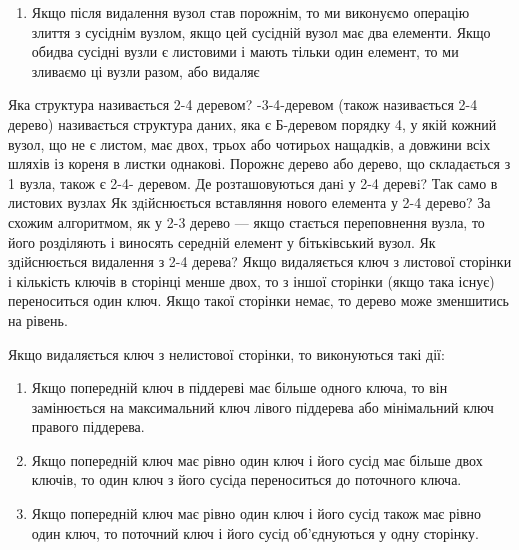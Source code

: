 \documentclass[a4paper, 12pt, oneside]{extarticle}
\begin{document}
\begin{itemize}
\begin{enumerate}
			\item Якщо після видалення вузол став порожнім, то ми виконуємо операцію злиття з сусіднім вузлом, якщо цей сусідній вузол має два елементи. Якщо обидва сусідні вузли є листовими і мають тільки один елемент, то ми зливаємо ці вузли разом, або видаляє
		\end{enumerate}

	\question Яка структура називається 2-4 деревом?
	-3-4-деревом (також називається 2-4 дерево) називається структура
даних, яка є Б-деревом порядку 4, у якій кожний вузол, що не є листом, має
двох, трьох або чотирьох нащадків, а довжини всіх шляхів із кореня в листки
однакові. Порожнє дерево або дерево, що складається з 1 вузла, також є 2-4-
деревом.
	\question Де розташовуються данi у 2-4 деревi?
	\answer Так само в листових вузлах
	\question Як здiйснюється вставляння нового елемента у 2-4 дерево?
	\answer За схожим алгоритмом, як у 2-3 дерево --- якщо стається переповнення вузла, то його розділяють і виносять середній елемент у бітьківський вузол.
	\question Як здiйснюється видалення з 2-4 дерева?
	\answer
Якщо видаляється ключ з листової сторінки і кількість ключів в сторінці менше двох, то з іншої сторінки (якщо така існує) переноситься один ключ. Якщо такої сторінки немає, то дерево може зменшитись на рівень.

Якщо видаляється ключ з нелистової сторінки, то виконуються такі дії:

		\begin{enumerate}
			\item Якщо попередній ключ в піддереві має більше одного ключа, то він замінюється на максимальний ключ лівого піддерева або мінімальний ключ правого піддерева.

			\item Якщо попередній ключ має рівно один ключ і його сусід має більше двох ключів, то один ключ з його сусіда переноситься до поточного ключа.

			\item Якщо попередній ключ має рівно один ключ і його сусід також має рівно один ключ, то поточний ключ і його сусід об'єднуються у одну сторінку.
		\end{enumerate}
\end{itemize}
\end{document}
